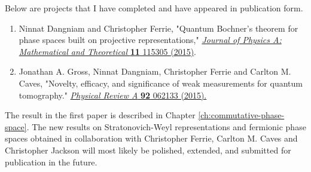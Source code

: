 
Below are projects that I have completed and have appeared in publication form.
\begin{enumerate}
	\item Ninnat Dangniam and Christopher Ferrie, "Quantum Bochner's theorem for phase spaces built on projective representations," \href{https://doi.org/10.1088/1751-8113/48/11/115305}{\emph{Journal of Physics A: Mathematical and Theoretical} {\bf 11} 115305 (2015)}.
	\item Jonathan A. Gross, Ninnat Dangniam, Christopher Ferrie and Carlton M. Caves, "Novelty, efficacy, and significance of weak measurements for quantum tomography." \href{https://doi.org/10.1103/PhysRevA.92.062133}{\emph{Physical Review A} {\bf 92} 062133 (2015).}
\end{enumerate}
The result in the first paper is described in Chapter \ref{ch:commutative-phase-space}. The new results on Stratonov\-ich-Weyl representations and fermionic phase spaces obtained in collaboration with Christopher Ferrie, Carlton M. Caves and Christopher Jackson will most likely be polished, extended, and submitted for publication in the future.
